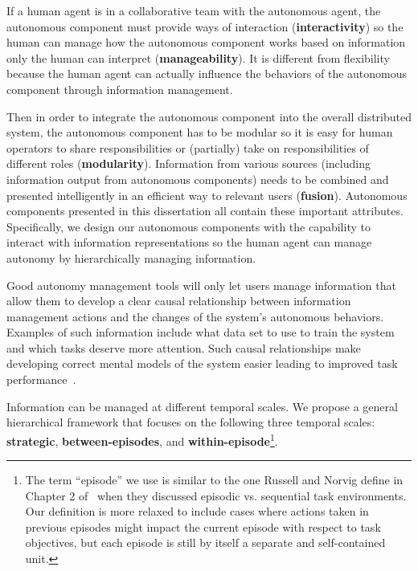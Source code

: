 If a human agent is in a collaborative team with the autonomous agent, the autonomous component must provide ways of interaction (\textbf{interactivity}) so the human can manage how the autonomous component works based on information only the human can interpret (\textbf{manageability}). It is different from flexibility because the human agent can actually influence the behaviors of the autonomous component through information management. 

Then in order to integrate the autonomous component into the overall distributed system, the autonomous component has to be modular so it is easy for human operators to share responsibilities or (partially) take on responsibilities of different roles (\textbf{modularity}). Information from various sources (including information output from autonomous components) needs to be combined and presented intelligently in an efficient way to relevant users (\textbf{fusion}). Autonomous components presented in this dissertation all contain these important attributes. Specifically, we design our autonomous components with the capability to interact with information representations so the human agent can manage autonomy by hierarchically managing information. 

Good autonomy management tools will only let users manage information that allow them to develop a clear causal relationship between information management actions and the changes of the system's autonomous behaviors. Examples of such information include what data set to use to train the system and which tasks deserve more attention. Such causal relationships make developing correct mental models of the system easier leading to improved task performance~\cite{Moray1990Lattice}. 

Information can be managed at different temporal scales. 
We propose a general hierarchical framework that focuses on the following three temporal scales: \textbf{strategic}, \textbf{between-episodes}, and \textbf{within-episode}\footnote{The term ``episode'' we use is similar to the one Russell and Norvig define in Chapter 2 of~\cite{Russell2009Artificial} when they discussed episodic vs. sequential task environments. Our definition is more relaxed to include cases where actions taken in previous episodes might impact the current episode with respect to task objectives, but each episode is still by itself a separate and self-contained unit.}. 

